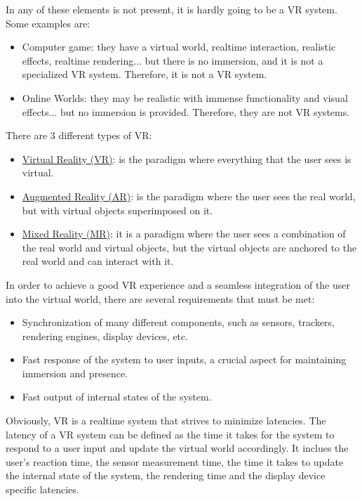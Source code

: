 In any of these elements is not present, it is hardly going to be a VR system. Some examples are:
\begin{itemize}
    \item Computer game: they have a virtual world, realtime interaction, realistic effects, realtime rendering... but there is no immersion, and it is not a specialized VR system. Therefore, it is not a VR system.
    \item Online Worlds: they may be realistic with immense functionality and visual effects... but no immersion is provided. Therefore, they are not VR systems.
\end{itemize}
    
There are $3$ different types of VR:
\begin{itemize}
    \item \ul{Virtual Reality (VR)}: is the paradigm where everything that the user sees is virtual.
    \item \ul{Augmented Reality (AR)}: is the paradigm where the user sees the real world, but with virtual objects superimposed on it.
    \item \ul{Mixed Reality (MR)}: it is a paradigm where the user sees a combination of the real world and virtual objects, but the virtual objects are anchored to the real world and can interact with it.
\end{itemize}

In order to achieve a good VR experience and a seamless integration of the user into the virtual world, there are several requirements that must be met:
\begin{itemize}
    \item Synchronization of many different components, such as sensors, trackers, rendering engines, display devices, etc. 
    \item Fast response of the system to user inputs, a crucial aspect for maintaining immersion and presence.
    \item Fast output of internal states of the system.
\end{itemize}

Obviously, VR is a realtime system that strives to minimize latencies. The latency of a VR system can be defined as the time it takes for the system to respond to a user input and update the virtual world accordingly. It inclues the user's reaction time, the sensor measurement time, the time it takes to update the internal state of the system, the rendering time and the display device specific latencies.\\

